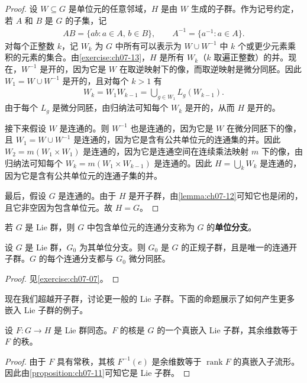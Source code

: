 \documentclass[../../main.tex]{subfiles}
\begin{document}
\begin{proof}
设 $W\subseteq G$ 是单位元的任意邻域，$H$ 是由 $W$ 生成的子群。作为记号约定，若 $A$ 和 $B$ 是 $G$ 的子集，记
\begin{align}
AB=\{ab:a\in A,\,b\in B\},\qquad A^{-1}=\{a^{-1}:a\in A\}.\label{align:ch07-05}
\end{align}
对每个正整数 $k$，记 $W_k$ 为 $G$ 中所有可以表示为 $W\cup W^{-1}$ 中 $k$ 个或更少元素乘积的元素的集合。由\cref{exercise:ch07-13}，$H$ 是所有 $W_k$（$k$ 取遍正整数）的并。现在，$W^{-1}$ 是开的，因为它是 $W$ 在取逆映射下的像，而取逆映射是微分同胚。因此 $W_1=W\cup W^{-1}$ 是开的，且对每个 $k>1$ 有
\begin{align*}
W_k=W_1W_{k-1}=\bigcup_{g\in W_1}L_g(W_{k-1}).
\end{align*}
由于每个 $L_g$ 是微分同胚，由归纳法可知每个 $W_k$ 是开的，从而 $H$ 是开的。

接下来假设 $W$ 是连通的。则 $W^{-1}$ 也是连通的，因为它是 $W$ 在微分同胚下的像，且 $W_1=W\cup W^{-1}$ 是连通的，因为它是含有公共单位元的连通集的并。因此 $W_2=m(W_1\times W_1)$ 是连通的，因为它是连通空间在连续乘法映射 $m$ 下的像，由归纳法可知每个 $W_k=m(W_1\times W_{k-1})$ 是连通的。因此 $H=\bigcup_k W_k$ 是连通的，因为它是含有公共单位元的连通子集的并。

最后，假设 $G$ 是连通的。由于 $H$ 是开子群，由\cref{lemma:ch07-12}可知它也是闭的，且它非空因为包含单位元。故 $H=G$。
\end{proof}

若 $G$ 是 Lie 群，则 $G$ 中包含单位元的连通分支称为 $G$ 的\textbf{单位分支}。

\begin{proposition}\label{proposition:ch07-15}
设 $G$ 是 Lie 群，$G_0$ 为其单位分支。则 $G_0$ 是 $G$ 的正规子群，且是唯一的连通开子群。$G$ 的每个连通分支都与 $G_0$ 微分同胚。
\end{proposition}

\begin{proof}
见\cref{exercise:ch07-07}。
\end{proof}

现在我们超越开子群，讨论更一般的 Lie 子群。下面的命题展示了如何产生更多嵌入 Lie 子群的例子。

\begin{proposition}\label{proposition:ch07-16}
设 $F\colon G\to H$ 是 Lie 群同态。$F$ 的核是 $G$ 的一个真嵌入 Lie 子群，其余维数等于 $F$ 的秩。
\end{proposition}

\begin{proof}
由于 $F$ 具有常秩，其核 $F^{-1}(e)$ 是余维数等于 $\operatorname{rank}F$ 的真嵌入子流形。因此由\cref{proposition:ch07-11}可知它是 Lie 子群。
\end{proof}
\end{document}
